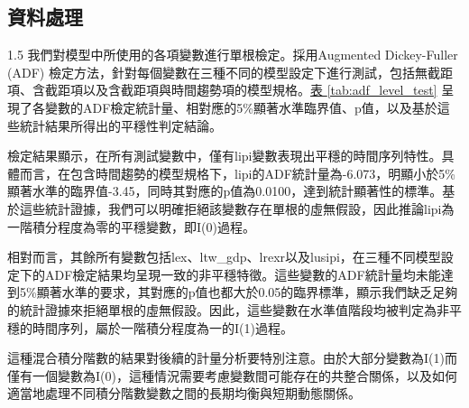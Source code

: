 \documentclass[a4paper,12pt]{article}
\begin{document}
\subsection{資料處理}
\begin{spacing}{1.5}
我們對模型中所使用的各項變數進行單根檢定。採用Augmented Dickey-Fuller (ADF) 檢定方法，針對每個變數在三種不同的模型設定下進行測試，包括無截距項、含截距項以及含截距項與時間趨勢項的模型規格。\hspace{1pt}\hyperref[tab:adf_level_test]{表 \ref{tab:adf_level_test}} 呈現了各變數的ADF檢定統計量、相對應的5\%顯著水準臨界值、p值，以及基於這些統計結果所得出的平穩性判定結論。

檢定結果顯示，在所有測試變數中，僅有lipi變數表現出平穩的時間序列特性。具體而言，在包含時間趨勢的模型規格下，lipi的ADF統計量為-6.073，明顯小於5\%顯著水準的臨界值-3.45，同時其對應的p值為0.0100，達到統計顯著性的標準。基於這些統計證據，我們可以明確拒絕該變數存在單根的虛無假設，因此推論lipi為一階積分程度為零的平穩變數，即I(0)過程。

相對而言，其餘所有變數包括lex、ltw\_gdp、lrexr以及lusipi，在三種不同模型設定下的ADF檢定結果均呈現一致的非平穩特徵。這些變數的ADF統計量均未能達到5\%顯著水準的要求，其對應的p值也都大於0.05的臨界標準，顯示我們缺乏足夠的統計證據來拒絕單根的虛無假設。因此，這些變數在水準值階段均被判定為非平穩的時間序列，屬於一階積分程度為一的I(1)過程。

這種混合積分階數的結果對後續的計量分析要特別注意。由於大部分變數為I(1)而僅有一個變數為I(0)，這種情況需要考慮變數間可能存在的共整合關係，以及如何適當地處理不同積分階數變數之間的長期均衡與短期動態關係。
\end{spacing}
\end{document}
